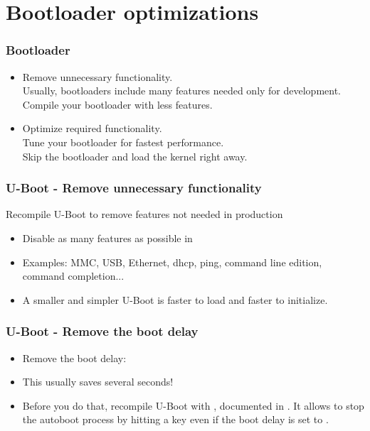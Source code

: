 \section{Bootloader optimizations}

\begin{frame}
\frametitle{Bootloader}
\begin{itemize}

\item Remove unnecessary functionality.\\
      Usually, bootloaders include many features needed only for
      development. Compile your bootloader with less features.
\item Optimize required functionality.\\
      Tune your bootloader for fastest performance. \\
      Skip the bootloader and load the kernel right away.
\end{itemize}
\end{frame}

\begin{frame}
\frametitle{U-Boot - Remove unnecessary functionality}
Recompile U-Boot to remove features not needed in production
\begin{itemize}
\item Disable as many features as possible
      in 
\item Examples: MMC, USB, Ethernet, dhcp, ping, command line edition,
      command completion...
\item A smaller and simpler U-Boot is faster to load and faster
      to initialize.
\end{itemize}
\end{frame}

\begin{frame}
\frametitle{U-Boot - Remove the boot delay}
\begin{itemize}
\item Remove the boot delay:\\
\item This usually saves several seconds!
\item Before you do that, recompile U-Boot with
      , documented in
      . It allows to stop the autoboot
      process by hitting a key even if the boot delay is set to
      .
\end{itemize}
\end{frame}

